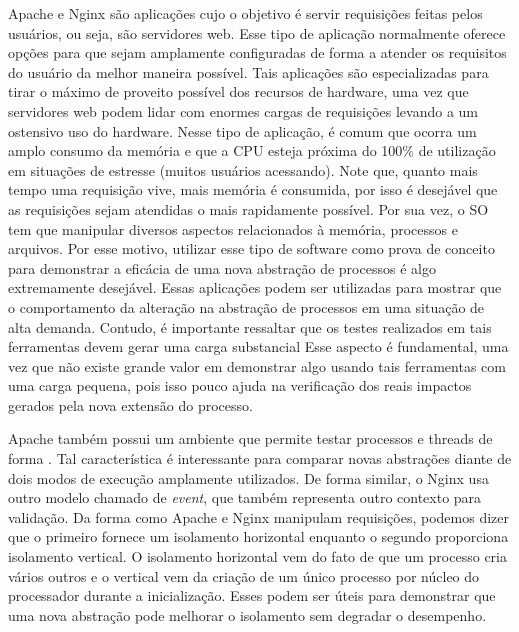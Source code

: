 Apache e Nginx são aplicações cujo o objetivo é servir requisições feitas
pelos usuários, ou seja, são servidores web. Esse tipo de aplicação normalmente
oferece opções para que sejam amplamente configuradas de forma a atender os
requisitos do usuário da melhor maneira possível. Tais aplicações são
especializadas para tirar o máximo de proveito possível dos recursos de hardware,
uma vez que servidores web podem lidar com enormes cargas de requisições
levando a um ostensivo uso do hardware. Nesse tipo de aplicação, é comum que
ocorra um amplo consumo da memória e que a CPU esteja próxima do 100\% de
utilização em situações de estresse (muitos usuários acessando).  Note que, quanto
mais tempo uma requisição vive, mais memória é consumida, por isso é desejável
que as requisições sejam atendidas o mais rapidamente possível. Por sua vez, o
SO tem que manipular diversos aspectos relacionados à memória, processos e
arquivos. Por esse motivo, utilizar esse tipo de software como prova de
conceito para demonstrar a eficácia de uma nova abstração de processos é algo
extremamente desejável. Essas aplicações podem ser utilizadas para mostrar que
o comportamento da alteração na abstração de processos em uma situação de alta
demanda. Contudo, é importante ressaltar que os testes realizados em tais
ferramentas devem gerar uma carga substancial  Esse aspecto é fundamental, uma vez que não existe
grande valor em demonstrar algo usando tais ferramentas com uma carga pequena,
pois isso pouco ajuda na verificação dos reais impactos gerados pela nova
extensão do processo.

Apache também possui um ambiente que permite testar processos e threads de
forma . Tal característica é interessante para comparar novas
abstrações diante de dois modos de execução amplamente utilizados. De forma
similar, o Nginx usa outro modelo chamado de \textit{event}, que também
representa outro contexto para validação. Da forma como Apache e Nginx
manipulam requisições, podemos dizer que o primeiro fornece um isolamento
horizontal enquanto o segundo proporciona isolamento vertical. O isolamento
horizontal vem do fato de que um processo cria vários outros e o vertical vem
da criação de um único processo por núcleo do processador durante a
inicialização. Esses  podem ser úteis para demonstrar
que uma nova abstração pode melhorar o isolamento sem degradar o desempenho.

